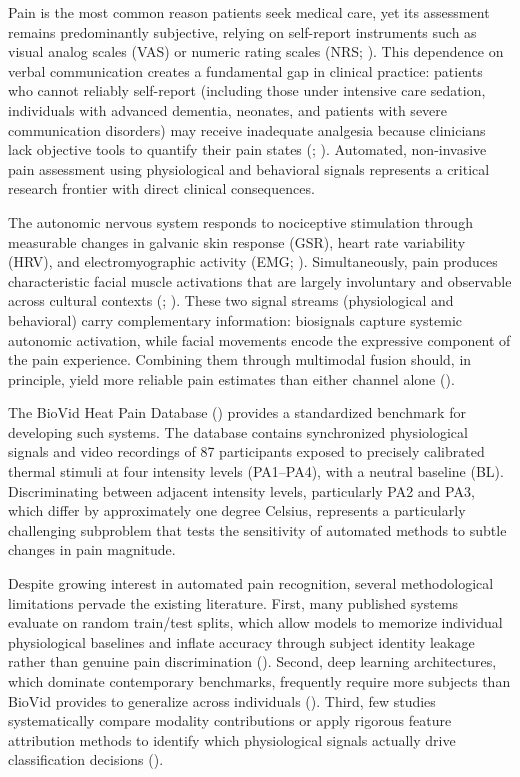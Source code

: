 \documentclass[10pt, twocolumn]{article}
\begin{document}
Pain is the most common reason patients seek medical care, yet its assessment remains
predominantly subjective, relying on self-report instruments such as visual analog scales
(VAS) or numeric rating scales (NRS; \cite{Jensen2003}). This dependence on verbal
communication creates a fundamental gap in clinical practice: patients who cannot reliably
self-report (including those under intensive care sedation, individuals with advanced
dementia, neonates, and patients with severe communication disorders) may receive
inadequate analgesia because clinicians lack objective tools to quantify their pain states
(\cite{Lichtner2014}; \cite{Puntillo2009}). Automated, non-invasive pain assessment using
physiological and behavioral signals represents a critical research frontier with direct
clinical consequences.

The autonomic nervous system responds to nociceptive stimulation through measurable changes
in galvanic skin response (GSR), heart rate variability (HRV), and electromyographic
activity (EMG; \cite{Loggia2011}). Simultaneously, pain produces characteristic facial
muscle activations that are largely involuntary and observable across cultural contexts
(\cite{Ekman1978}; \cite{Prkachin2008}). These two signal streams (physiological and
behavioral) carry complementary information: biosignals capture systemic autonomic
activation, while facial movements encode the expressive component of the pain experience.
Combining them through multimodal fusion should, in principle, yield more reliable pain
estimates than either channel alone (\cite{Werner2019}).

The BioVid Heat Pain Database (\cite{Walter2013}) provides a standardized benchmark for
developing such systems. The database contains synchronized physiological signals and video
recordings of 87 participants exposed to precisely calibrated thermal stimuli at four
intensity levels (PA1--PA4), with a neutral baseline (BL). Discriminating between adjacent
intensity levels, particularly PA2 and PA3, which differ by approximately one degree
Celsius, represents a particularly challenging subproblem that tests the sensitivity of
automated methods to subtle changes in pain magnitude.

Despite growing interest in automated pain recognition, several methodological limitations
pervade the existing literature. First, many published systems evaluate on random train/test
splits, which allow models to memorize individual physiological baselines and inflate
accuracy through subject identity leakage rather than genuine pain discrimination
(\cite{Gruss2015}). Second, deep learning architectures, which dominate contemporary
benchmarks, frequently require more subjects than BioVid provides to generalize across
individuals (\cite{Kachele2015}). Third, few studies systematically compare modality
contributions or apply rigorous feature attribution methods to identify which physiological
signals actually drive classification decisions (\cite{Tavakolian2020}).
\end{document}
